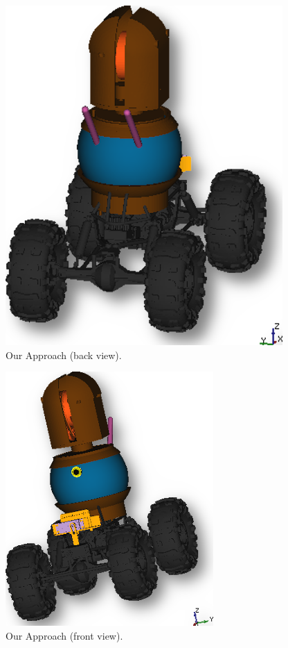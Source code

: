 \documentclass[Afour,sageh,times]{sagej}
\begin{document}
\begin{figure}
    \centering
    \includegraphics[scale=15]{robot.png}
    \caption{Our Approach (back view).}
    \label{fig:back_view}
\end{figure}
\begin{figure}
    \centering
    \includegraphics[scale=20]{robot1.png}
    \caption{Our Approach (front view).}
    \label{fig:front_view}
\end{figure}
\end{document}
